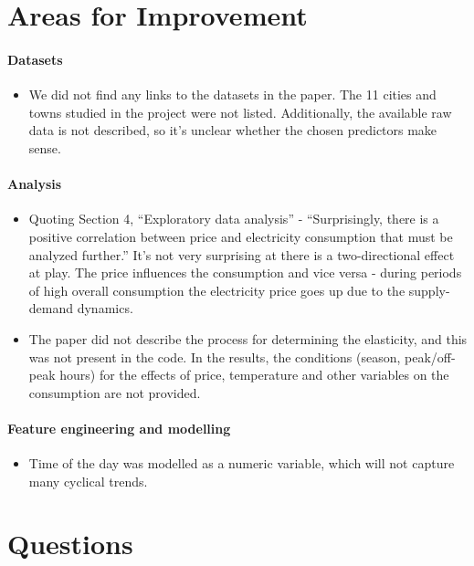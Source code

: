 \documentclass[12pt]{article}
\begin{document}
\section{Areas for Improvement}

\paragraph{Datasets}

\begin{itemize}
   \item We did not find any links to the datasets in the paper. The 11 cities and towns studied in the project were not listed. Additionally, the available raw data is not described, so it’s unclear whether the chosen predictors make sense.
\end{itemize}

\paragraph{Analysis}

\begin{itemize}
   \item Quoting Section 4, “Exploratory data analysis” - “Surprisingly, there is a positive correlation between price and electricity consumption that must be analyzed further.” It’s not very surprising at there is a two-directional effect at play. The price influences the consumption and vice versa - during periods of high overall consumption the electricity price goes up due to the supply-demand dynamics.
   \item The paper did not describe the process for determining the elasticity, and this was not present in the code.
   In the results, the conditions (season, peak/off-peak hours) for the effects of price, temperature and other variables on the consumption are not provided.
\end{itemize}

\paragraph{Feature engineering and modelling}

\begin{itemize}
   \item Time of the day was modelled as a numeric variable, which will not capture many cyclical trends.
\end{itemize}

\section{Questions}
\end{document}
